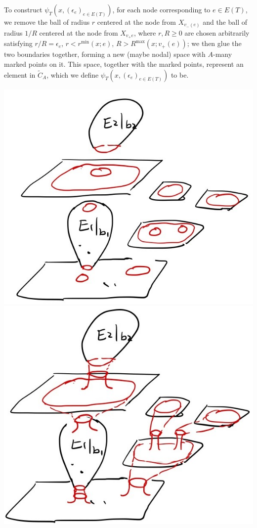 \documentclass[11pt]{article}
\theoremstyle{definition}
\theoremstyle{remark}
\def\wt#1{\widetilde{#1}}
\begin{document}
To construct $\psi_T(x,(\epsilon_e)_{e\in E(T)})$, 
for each node corresponding to $e\in E(T)$, we remove the ball of radius $r$ centered at the node from $X_{v_-(e)}$ and the ball of radius $1/R$ centered at the node from $X_{v_+e}$, where $r,R\ge0$ are chosen arbitrarily satisfying $r/R=\epsilon_e$, $r<r^{\min}(x;e)$, $R>R^{\max}(x;v_+(e))$; 
we then glue the two boundaries together, forming a new (maybe nodal) space with $A$-many marked points on it. This space, together with the marked points, represent an element in $\wt{C}_A$, which we define $\psi_T(x,(\epsilon_e)_{e\in E(T)})$ to be. 

\includegraphics[scale=0.15]{xcut_fig}
\hspace{3cm}
\includegraphics[scale=0.15]{xglue_fig}
 
\end{document}

